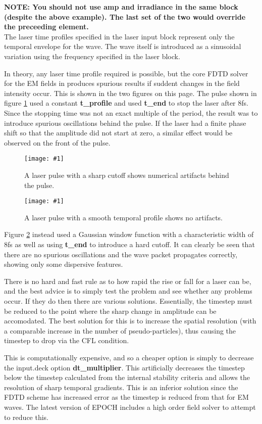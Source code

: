\documentclass[12pt,a4paper]{article}
\newcommand{\emphtext}{\color{warwickdark} \fontfamily{phv}\selectfont\Large\bf}
\newcommand{\inlineemph}[1]{{\color{warwicklight} \bf{#1}}}
\newcommand{\EPOCH}{{\color{warwickdark}\fontfamily{phv}\selectfont{EPOCH}}}
\newcommand{\captionedimage}[3]
  {{\begin{figure}\centering\texttt{[image: \#1]}\caption{#3}\label{#2}
    \end{figure}}}
\begin{document}
{\emphtext NOTE: You should not use amp and irradiance in the same block
(despite the above example). The last set of the two would override the
preceeding element.}\\

The laser time profiles specified in the laser input block represent only the
temporal envelope for the wave. The wave itself is introduced as a sinusoidal
variation using the frequency specified in the laser block.

In theory, any laser time profile required is possible, but the core FDTD
solver for the EM fields in {\EPOCH} produces spurious results if suddent changes
in the field intensity occur. This is shown in the two figures on this
page. The pulse shown in figure \ref{badpulse} used a constant
\inlineemph{t\_profile} and used \inlineemph{t\_end} to stop the laser after
8fs. Since
the stopping time was not an exact multiple of the period, the result was to
introduce spurious oscillations behind the pulse. If the laser had a finite
phase shift so that the amplitude did not start at zero, a similar effect would
be observed on the front of the pulse.

\captionedimage{./images/pulse2}{badpulse}{A laser pulse with a sharp
cutoff shows numerical artifacts behind the pulse.}
\captionedimage{./images/pulse1}{smoothpulse}{A laser pulse with a smooth
temporal profile shows no artifacts.}

Figure \ref{smoothpulse} instead used a Gaussian window function with a
characteristic width of 8fs as well as using \inlineemph{t\_end} to introduce
a hard cutoff. It can clearly be seen that there are no spurious oscillations
and the wave packet propagates correctly, showing only some dispersive
features.

There is no hard and fast rule as to how rapid the rise or fall for a laser can
be, and the best advice is to simply test the problem and see whether any
problems occur. If they do then there are various solutions. Essentially, the
timestep must be reduced to the point where the sharp change in amplitude can
be accomodated. The best solution for this is to increase the spatial
resolution (with a comparable increase in the number of pseudo-particles), thus
causing the timestep to drop via the CFL condition.

This is computationally expensive, and so a cheaper option is simply to
decrease the input.deck option \inlineemph{dt\_multiplier}. This artificially
decreases the timestep below the timestep calculated from the internal
stability criteria and allows the resolution of sharp temporal gradients. This
is an inferior solution since the FDTD scheme has increased error as the
timestep is reduced from that for EM waves. The latest version of EPOCH
includes a high order field solver to attempt to reduce this.
\end{document}
